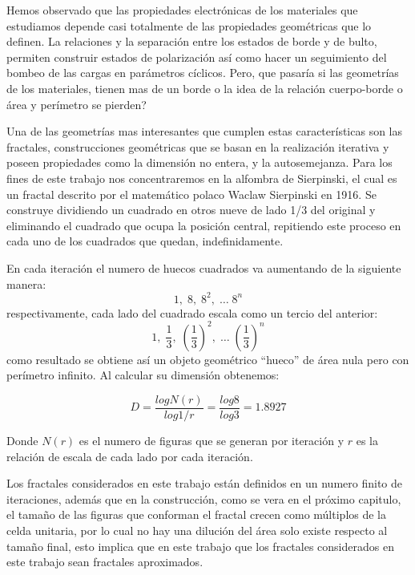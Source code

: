Hemos observado que las propiedades electrónicas de los materiales que estudiamos depende casi totalmente de las propiedades geométricas que lo definen. La relaciones y la separación entre los estados de borde y de bulto, permiten construir estados de polarización así como hacer un seguimiento del bombeo de las cargas en parámetros cíclicos. Pero, que pasaría si las geometrías de los materiales, tienen mas de un borde o la idea de la relación cuerpo-borde o área y perímetro se pierden? 

Una de las geometrías mas interesantes que cumplen estas características son las fractales, construcciones geométricas que se basan en la realización iterativa y poseen propiedades como la dimensión no entera, y la autosemejanza. Para los fines de este trabajo nos concentraremos en la alfombra de Sierpinski, el cual es un fractal descrito por el matemático polaco Waclaw Sierpinski en 1916. Se construye dividiendo un cuadrado en otros nueve de lado 1/3 del original y eliminando el cuadrado que ocupa la posición central, repitiendo este proceso en cada uno de los cuadrados que
quedan, indefinidamente.

En cada iteración el numero de huecos cuadrados va aumentando de la siguiente manera:
\begin{equation}
    1,\; 8, \; 8^2,\;\dots\; 8^n
\end{equation}
respectivamente, cada lado del cuadrado escala como un tercio del anterior:
\begin{equation}
    1,\; \frac{1}{3}, \; \left( \frac{1}{3} \right)^2,\;\dots\; \left( \frac{1}{3} \right)^n
\end{equation}
como resultado se obtiene así un objeto geométrico “hueco” de área nula pero con perímetro infinito. Al calcular su dimensión obtenemos:

\begin{equation}
    D = \frac{log N(r)}{log 1/r} = \frac{log 8}{log 3} = 1.8927
\end{equation}

Donde $N(r)$ es el numero de figuras que se generan por iteración y $r$ es la relación de escala de cada lado por cada iteración.

Los fractales considerados en este trabajo están definidos en un numero finito de iteraciones, además que en la construcción, como se vera en el próximo capitulo, el tamaño de las figuras que conforman el fractal crecen como múltiplos de la celda unitaria, por lo cual no hay una dilución del área solo existe respecto al tamaño final, esto implica que en este trabajo que los fractales considerados en este trabajo sean fractales aproximados.

